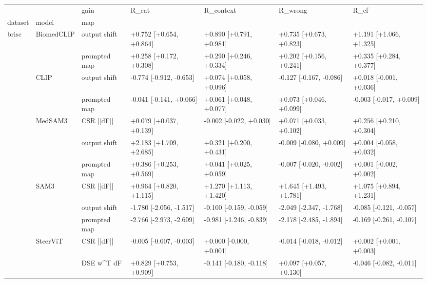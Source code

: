 \begin{tabular}{lllllll}
\toprule
 &  & gain & R_cat & R_context & R_wrong & R_cf \\
dataset & model & map &  &  &  &  \\
\midrule
\multirow[t]{13}{*}{brisc} & \multirow[t]{2}{*}{BiomedCLIP} & output shift & +0.752 [+0.654, +0.864] & +0.890 [+0.791, +0.981] & +0.735 [+0.673, +0.823] & +1.191 [+1.066, +1.325] \\
 &  & prompted map & +0.258 [+0.172, +0.308] & +0.290 [+0.246, +0.334] & +0.202 [+0.156, +0.241] & +0.335 [+0.284, +0.377] \\
\cline{2-7}
 & \multirow[t]{2}{*}{CLIP} & output shift & -0.774 [-0.912, -0.653] & +0.074 [+0.058, +0.096] & -0.127 [-0.167, -0.086] & +0.018 [-0.001, +0.036] \\
 &  & prompted map & -0.041 [-0.141, +0.066] & +0.061 [+0.048, +0.077] & +0.073 [+0.046, +0.099] & -0.003 [-0.017, +0.009] \\
\cline{2-7}
 & \multirow[t]{3}{*}{MedSAM3} & CSR  ||dF|| & +0.079 [+0.037, +0.139] & -0.002 [-0.022, +0.030] & +0.071 [+0.033, +0.102] & +0.256 [+0.210, +0.304] \\
 &  & output shift & +2.183 [+1.709, +2.685] & +0.321 [+0.200, +0.431] & -0.009 [-0.080, +0.009] & +0.004 [-0.058, +0.032] \\
 &  & prompted map & +0.386 [+0.253, +0.569] & +0.041 [+0.025, +0.059] & -0.007 [-0.020, -0.002] & +0.001 [-0.002, +0.002] \\
\cline{2-7}
 & \multirow[t]{3}{*}{SAM3} & CSR  ||dF|| & +0.964 [+0.820, +1.115] & +1.270 [+1.113, +1.420] & +1.645 [+1.493, +1.781] & +1.075 [+0.894, +1.231] \\
 &  & output shift & -1.780 [-2.056, -1.517] & -0.100 [-0.159, -0.059] & -2.049 [-2.347, -1.768] & -0.085 [-0.121, -0.057] \\
 &  & prompted map & -2.766 [-2.973, -2.609] & -0.981 [-1.246, -0.839] & -2.178 [-2.485, -1.894] & -0.169 [-0.261, -0.107] \\
\cline{2-7}
 & \multirow[t]{3}{*}{SteerViT} & CSR  ||dF|| & -0.005 [-0.007, -0.003] & +0.000 [-0.000, +0.001] & -0.014 [-0.018, -0.012] & +0.002 [+0.001, +0.003] \\
 &  & DSE  w^T dF & +0.829 [+0.753, +0.909] & -0.141 [-0.180, -0.118] & +0.097 [+0.057, +0.130] & -0.046 [-0.082, -0.011] \\

\end{tabular}
